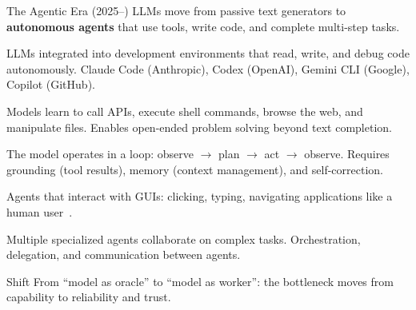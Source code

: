 \begin{frame}{The Agentic Era (2025--)}
  LLMs move from passive text generators to \textbf{autonomous agents} that use tools, write code, and complete multi-step tasks.

  \begin{description}[style=nextline]
    \item[Code agents] LLMs integrated into development environments that read, write, and debug code autonomously.
      Claude Code (Anthropic), Codex (OpenAI), Gemini CLI (Google), Copilot (GitHub).
    \item[Tool use] Models learn to call APIs, execute shell commands, browse the web, and manipulate files.
      Enables open-ended problem solving beyond text completion.
    \item[Agentic loops] The model operates in a loop: observe $\to$ plan $\to$ act $\to$ observe.
      Requires grounding (tool results), memory (context management), and self-correction.
    \item[Computer use] Agents that interact with GUIs: clicking, typing, navigating applications like a human user~\cite{anthropic2024computeruse}.
    \item[Multi-agent systems] Multiple specialized agents collaborate on complex tasks.
      Orchestration, delegation, and communication between agents.
  \end{description}

  \begin{alertblock}{Shift}
    From ``model as oracle'' to ``model as worker'': the bottleneck moves from capability to reliability and trust.
  \end{alertblock}
\end{frame}


